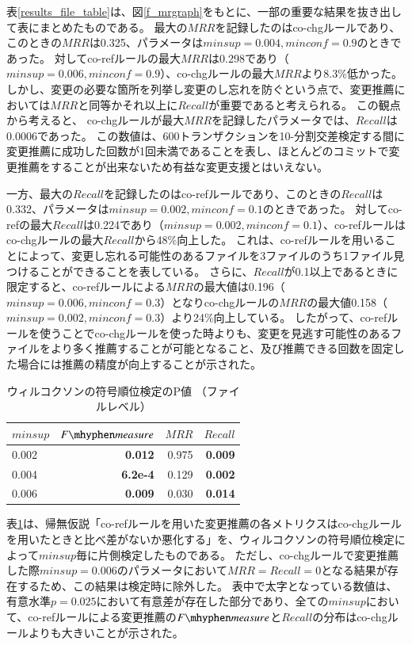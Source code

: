 \documentclass[a4paper]{jsbook}
\newcommand{\minconf}{mincon\!f}
\newcommand{\fmeasure}{F\mhyphen measure}
\begin{document}
表\ref{results_file_table}は、図\ref{f_mrgraph}をもとに、一部の重要な結果を抜き出して表にまとめたものである。
最大の$MRR$を記録したのはco-chgルールであり、このときの$MRR$は0.325、パラメータは$minsup=0.004,\minconf=0.9$のときであった。
対してco-refルールの最大$MRR$は0.298であり（$minsup=0.006,\minconf=0.9$）、co-chgルールの最大$MRR$より8.3\%低かった。
しかし、変更の必要な箇所を列挙し変更のし忘れを防ぐという点で、変更推薦においては$MRR$と同等かそれ以上に$Recall$が重要であると考えられる。
この観点から考えると、 co-chgルールが最大$MRR$を記録したパラメータでは、$Recall$は0.0006であった。
この数値は、600トランザクションを10-分割交差検定する間に変更推薦に成功した回数が1回未満であることを表し、ほとんどのコミットで変更推薦をすることが出来ないため有益な変更支援とはいえない。

一方、最大の$Recall$を記録したのはco-refルールであり、このときの$Recall$は0.332、パラメータは$minsup=0.002,\minconf=0.1$のときであった。
対してco-refの最大$Recall$は0.224であり（$minsup=0.002,\minconf=0.1$）、co-refルールはco-chgルールの最大$Recall$から48\%向上した。
これは、co-refルールを用いることによって、変更し忘れる可能性のあるファイルを3ファイルのうち1ファイル見つけることができることを表している。
さらに、$Recall$が0.1以上であるときに限定すると、co-refルールによる$MRR$の最大値は0.196（$minsup=0.006,\minconf=0.3$）となりco-chgルールの$MRR$の最大値0.158（$minsup=0.002,\minconf=0.3$）より24\%向上している。
したがって、co-refルールを使うことでco-chgルールを使った時よりも、変更を見逃す可能性のあるファイルをより多く推薦することが可能となること、及び推薦できる回数を固定した場合には推薦の精度が向上することが示された。

\begin{table}[t]
  \begin{center}
    \caption{ウィルコクソンの符号順位検定のP値 （ファイルレベル）}
    \label{pvalue_file}
    \begin{tabular}{l|rrr}
      \hline
      $minsup$ & $\fmeasure$ & $MRR$ & $Recall$\\
      \hline
      0.002 & {\bf 0.012} & 0.975 & {\bf 0.009}\\
      0.004 & {\bf 6.2e-4} & 0.129 & {\bf 0.002}\\
      0.006 & {\bf 0.009} & 0.030 & {\bf 0.014}\\
      \hline
    \end{tabular}
  \end{center}
\end{table}

表\ref{pvalue_file}は、帰無仮説「co-refルールを用いた変更推薦の各メトリクスはco-chgルールを用いたときと比べ差がないか悪化する」を、ウィルコクソンの符号順位検定によって$minsup$毎に片側検定したものである。
ただし、co-chgルールで変更推薦した際$minsup=0.006$のパラメータにおいて$MRR=Recall=0$となる結果が存在するため、この結果は検定時に除外した。
表中で太字となっている数値は、有意水準$p=0.025$において有意差が存在した部分であり、全ての$minsup$において、co-refルールによる変更推薦の$\fmeasure$と$Recall$の分布はco-chgルールよりも大きいことが示された。
\end{document}
